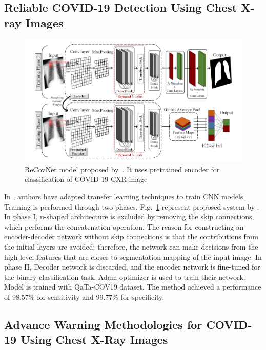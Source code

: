 \subsection{Reliable COVID-19 Detection Using Chest X-ray Images}
\begin{figure}
    \begin{center}
        \includegraphics[width=\textwidth]{Figures/RltDag.png}
        \caption{\label{rlt:dag} ReCovNet model proposed by~\cite{dag}. It uses pretrained encoder for classification of COVID-19 CXR image}
    \end{center}
\end{figure}
In \cite{dag}, authors have adapted transfer learning techniques to train CNN models. Training is performed through two phases. Fig.~\ref{rlt:dag} represent proposed system by \cite{dag}. In phase I, u-shaped architecture is excluded by removing the skip connections, which performs the concatenation operation. The reason for constructing an encoder-decoder network without skip connections is that the contributions from the initial layers are avoided; therefore, the network can make decisions from the high level features that are closer to segmentation mapping of the input image.  In phase II, Decoder network is discarded, and the encoder network is fine-tuned for the binary classification task. Adam optimizer is used to train their network. Model is trained with QaTa-COV19 dataset. The method achieved a performance of 98.57\% for sensitivity and 99.77\%  for specificity.

\subsection{Advance Warning Methodologies for
COVID-19 Using Chest X-Ray Images}


